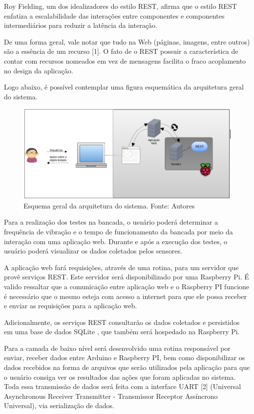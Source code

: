 Roy Fielding, um dos idealizadores do estilo REST,  afirma que o estilo REST enfatiza a escalabilidade das interações entre componentes e componentes intermediários para reduzir a latência da interação.

De uma forma geral, vale notar que tudo na Web (páginas, imagens, entre outros) são a essência de um recurso [1]. O fato de o REST  possuir a  característica de contar com recursos nomeados em vez de mensagens facilita o fraco acoplamento no design da aplicação.
    
Logo abaixo, é possível contemplar uma figura esquemática da arquitetura geral do sistema.

\begin{figure}[!ht]
\centering
\includegraphics[scale=0.5]{figuras/arquitetura_sistema.png}
\caption{Esquema geral da arquitetura do sistema. Fonte: Autores}
\label{fig:arquitetura_sistema}
\end{figure}

Para a realização dos testes na bancada, o usuário poderá determinar a frequência de vibração e o tempo de funcionamento da bancada por meio da interação com uma aplicação web. Durante e após a execução dos testes, o usuário poderá visualizar os dados coletados pelos sensores.

A aplicação web fará requisições, através de uma rotina, para um servidor que provê serviços REST. Este servidor será disponibilizado por uma Raspberry Pi. É valido ressaltar que a comunicação entre aplicação web e o Raspberry PI funcione é necessário que o mesmo esteja com acesso a internet para que ele possa receber e enviar as requisições para a aplicação web. 

Adicionalmente, os serviços REST consultarão os dados coletados e persistidos em uma base de dados SQLite , que também será hospedado na Raspberry Pi.

Para a camada de baixo nível será desenvolvido uma rotina responsável por enviar, receber dados entre Arduino e Raspberry PI, bem como disponibilizar os dados recebidos na forma de arquivos que serão utilizados pela aplicação para que o usuário consiga ver os resultados das ações que foram aplicadas no sistema. Toda essa transmissão de dados será feita com a interface UART [2] (Universal Asynchronous Receiver Transmitter - Transmissor Receptor Assíncrono Universal), via serialização de dados.

